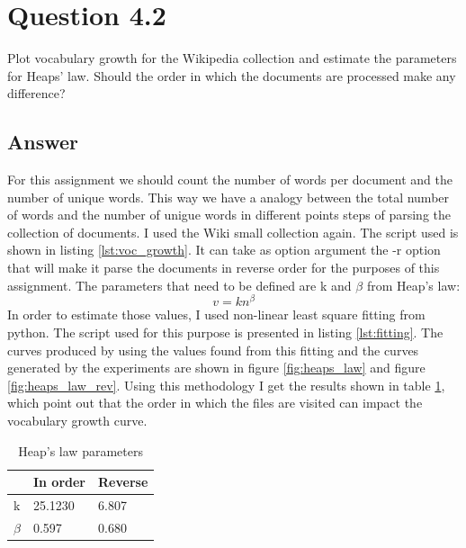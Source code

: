 \documentclass{article}
\begin{document}
		\section*{Question 4.2}
		Plot vocabulary growth for the Wikipedia collection and estimate the parameters for Heaps’ law. Should the order in which the documents are processed make any difference?
		\subsection*{Answer}
		For this assignment we should count the number of words per document and the number of unique words. This way we have a analogy between the total number of words and the number of unigue words in different points steps of parsing the collection of documents. I used the Wiki small collection again. The script used is shown in listing \ref{lst:voc_growth}. It can take as option argument the -r option that will make it parse the documents in reverse order for the purposes of this assignment. 
		The parameters that need to be defined are k and $\beta$ from Heap's law:$$v=kn^{\beta}$$
		In order to estimate those values, I used non-linear least square fitting from python. The script used for this purpose is presented in listing \ref{lst:fitting}. The curves produced by using the values found from this fitting and the curves generated by the experiments are shown in figure \ref{fig:heaps_law} and figure \ref{fig:heaps_law_rev}. Using this methodology I get the results shown in table \ref{tb:order_rev}, which point out that the order in which the files are visited can impact the vocabulary growth curve.
		
		
		\begin{table}[h]
			\centering
			\caption{Heap's law parameters}
			\label{tb:order_rev}
			\begin{tabular}{|l|l|l|}
				\hline
				& In order & Reverse \\ \hline
				k       & 25.1230  & 6.807   \\ \hline
				$\beta$ & 0.597    & 0.680  \\ \hline
			\end{tabular}
		\end{table}
\end{document}
